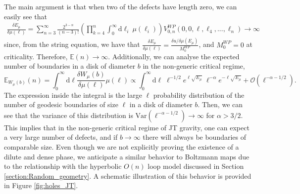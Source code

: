 \documentclass[a4paper,11pt]{article}
\newcommand{\rmd}{\mathrm{d}}
\begin{document}
The main argument is that when two of the defects have length zero, we can easily see that  
\begin{equation}
    \begin{split}
        \frac{\delta E_\mu}{\delta \mu(\ell)} =
        \sum_{n=3}^{\infty} \frac{2^{3-n}}{(n-3)!} \left( \prod_{k=4}^{n} \int_{0}^{\infty}  \rmd \ell_i \ \mu\left(\ell_i\right) \right) V^{WP}_{0,n}\left(0, 0, \ell, \ell_4, ..., \ell_{n}\right) \rightarrow \infty
    \end{split}
    \label{eq: R dmu}
\end{equation}
since, from the string equation, we have that $ \frac{\delta E_\mu}{\delta \mu(\ell)} = \frac{\delta u/\delta \mu (E_\mu)}{M^{WP}_0}$, and $M^{WP}_0=0$ at criticality. Therefore, $\mathbb{E}(n)\rightarrow\infty$.
Additionally, we can analyse the expected number of boundaries in a disk of diameter $b$ in the non-generic critical regime,
\begin{equation}
    \mathbb{E}_{W_\mu(b)}(n)=\int_0^\infty \rmd \ell \frac{\delta W_\mu(b)}{\delta \mu (\ell)}\mu(\ell) 	\propto \int_0^\infty \rmd \ell \; \ell^{-1/2}e^{\ell\sqrt{E_\mu}}\; \ell^{-\alpha}e^{-\ell \sqrt{E_\mu}} + \mathcal{O}(\ell^{-\alpha-1/2}).
\end{equation}
The expression inside the integral is the large $\ell$ probability distribution of the number of geodesic boundaries of size $\ell$ in a disk of diameter $b$. Then, we can see that the variance of this distribution is $\text{Var}(\ell^{-\alpha-1/2})\rightarrow\infty$ for $\alpha>3/2$. This implies that in the non-generic critical regime of JT gravity, one can expect a very large number of defects, and if $b\rightarrow\infty$ there will always be boundaries of comparable size. 
Even though we are not explicitly proving the existence of a dilute and dense phase, we anticipate a similar behavior to Boltzmann maps due to the relationship with the hyperbolic $O(n)$ loop model discussed in Section \ref{section:Random_geometry}. A schematic illustration of this behavior is provided in Figure \ref{fig:holes_JT}.\\
\end{document}
